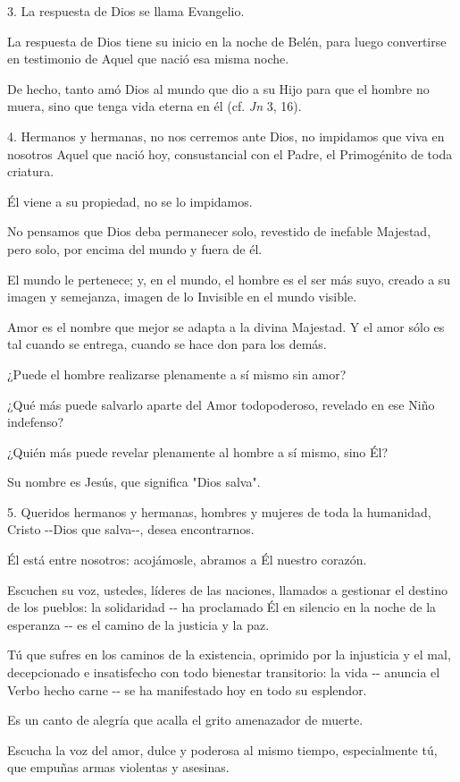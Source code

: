 3. La respuesta de Dios se llama Evangelio.

La respuesta de Dios tiene su inicio en la noche de Belén, para luego
convertirse en testimonio de Aquel que nació esa misma noche.

De hecho, tanto amó Dios al mundo que dio a su Hijo para que el hombre
no muera, sino que tenga vida eterna en él (cf. \emph{Jn} 3, 16).

4. Hermanos y hermanas, no nos cerremos ante Dios, no impidamos que viva
en nosotros Aquel que nació hoy, consustancial con el Padre, el
Primogénito de toda criatura.

Él viene a su propiedad, no se lo impidamos.

No pensamos que Dios deba permanecer solo, revestido de inefable
Majestad, pero solo, por encima del mundo y fuera de él.

El mundo le pertenece; y, en el mundo, el hombre es el ser más suyo,
creado a su imagen y semejanza, imagen de lo Invisible en el mundo
visible.

Amor es el nombre que mejor se adapta a la divina Majestad. Y el amor
sólo es tal cuando se entrega, cuando se hace don para los demás.

¿Puede el hombre realizarse plenamente a sí mismo sin amor?

¿Qué más puede salvarlo aparte del Amor todopoderoso, revelado en ese
Niño indefenso?

¿Quién más puede revelar plenamente al hombre a sí mismo, sino Él?

Su nombre es Jesús, que significa "Dios salva".

5. Queridos hermanos y hermanas, hombres y mujeres de toda la humanidad,
Cristo -\/-Dios que salva-\/-, desea encontrarnos.

Él está entre nosotros: acojámosle, abramos a Él nuestro corazón.

Escuchen su voz, ustedes, líderes de las naciones, llamados a gestionar
el destino de los pueblos: la solidaridad -\/- ha proclamado Él en
silencio en la noche de la esperanza -\/- es el camino de la justicia y
la paz.

Tú que sufres en los caminos de la existencia, oprimido por la
injusticia y el mal, decepcionado e insatisfecho con todo bienestar
transitorio: la vida -\/- anuncia el Verbo hecho carne -\/- se ha
manifestado hoy en todo su esplendor.

Es un canto de alegría que acalla el grito amenazador de muerte.

Escucha la voz del amor, dulce y poderosa al mismo tiempo, especialmente
tú, que empuñas armas violentas y asesinas.

